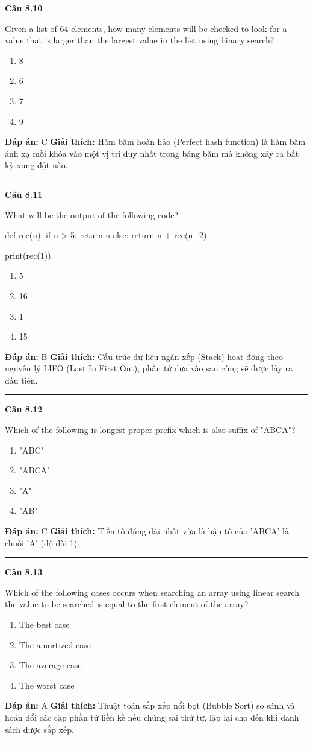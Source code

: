 \documentclass[11pt,a4paper]{article}
\newenvironment{question}[1]{%
  \par\vspace{1em}\noindent\textbf{\large Câu #1}\par\vspace{0.4em}
}{%
  \par\vspace{1em}\hrule\vspace{0.6em}
}
\newenvironment{choices}{%
  \begin{enumerate}[label=\textbf{\Alph*.},leftmargin=2.2em,itemsep=2pt,topsep=3pt]
}{%
  \end{enumerate}
}
\newcommand{\choice}{\item}
\newenvironment{codebox}{%
  \begin{tcolorbox}[colback=gray!8!white,colframe=gray!50!black,arc=1.5mm,boxrule=0.6pt,left=3mm,right=3mm,top=2.5mm,bottom=2.5mm]
  \ttfamily\small
}{%
  \end{tcolorbox}
}
\begin{document}
\begin{question}{8.10}
Given a list of 64 elements, how many elements will be checked to look for a value that is larger than the largest value in the list using binary search?
\begin{choices}
\choice 8
\choice 6
\choice 7
\choice 9
\end{choices}
\textbf{Đáp án:} C
\textbf{Giải thích:} Hàm băm hoàn hảo (Perfect hash function) là hàm băm ánh xạ mỗi khóa vào một vị trí duy nhất trong bảng băm mà không xảy ra bất kỳ xung đột nào.
\end{question}

\begin{question}{8.11}
What will be the output of the following code?
\begin{codebox}
def rec(n):
    if n > 5:
        return n
    else:
        return n + rec(n+2)

print(rec(1))
\end{codebox}
\begin{choices}
\choice 5
\choice 16
\choice 1
\choice 15
\end{choices}
\textbf{Đáp án:} B
\textbf{Giải thích:} Cấu trúc dữ liệu ngăn xếp (Stack) hoạt động theo nguyên lý LIFO (Last In First Out), phần tử đưa vào sau cùng sẽ được lấy ra đầu tiên.
\end{question}

\begin{question}{8.12}
Which of the following is longest proper prefix which is also suffix of "ABCA"?
\begin{choices}
\choice "ABC"
\choice "ABCA"
\choice "A"
\choice "AB"
\end{choices}
\textbf{Đáp án:} C
\textbf{Giải thích:} Tiền tố đúng dài nhất vừa là hậu tố của 'ABCA' là chuỗi 'A' (độ dài 1).
\end{question}

\begin{question}{8.13}
Which of the following cases occurs when searching an array using linear search the value to be searched is equal to the first element of the array?
\begin{choices}
\choice The best case
\choice The amortized case
\choice The average case
\choice The worst case
\end{choices}
\textbf{Đáp án:} A
\textbf{Giải thích:} Thuật toán sắp xếp nổi bọt (Bubble Sort) so sánh và hoán đổi các cặp phần tử liền kề nếu chúng sai thứ tự, lặp lại cho đến khi danh sách được sắp xếp.
\end{question}
\end{document}
